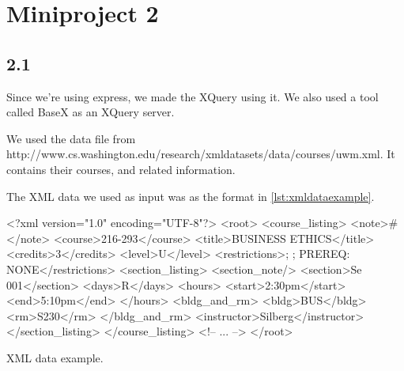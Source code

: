 \chapter{Miniproject 2}
\section{2.1 }

Since we’re using express, we made the XQuery using it. We also used a tool called BaseX as an XQuery server.

We used the data file from http://www.cs.washington.edu/research/xmldatasets/data/courses/uwm.xml.
It contains their courses, and related information.

The XML data we used as input was as the format in \cref{lst:xmldataexample}.

\begin{listing}
    \begin{xmlblock}
        <?xml version="1.0" encoding="UTF-8"?>
        <root>
            <course_listing>
                <note>#</note>
                <course>216-293</course>
                <title>BUSINESS ETHICS</title>
                <credits>3</credits>
                <level>U</level>
                <restrictions>; ; PREREQ: NONE</restrictions>
                <section_listing>
                    <section_note/>
                    <section>Se 001</section>
                    <days>R</days>
                    <hours>
                        <start>2:30pm</start>
                        <end>5:10pm</end>
                    </hours>
                    <bldg_and_rm>
                    <bldg>BUS</bldg>
                    <rm>S230</rm>
                    </bldg_and_rm>
                    <instructor>Silberg</instructor>
                </section_listing>
            </course_listing>
            <!-- ... -->
        </root>
    \end{xmlblock}
    \caption{XML data example.}
    \label{lst:xmldataexample}
\end{listing}

